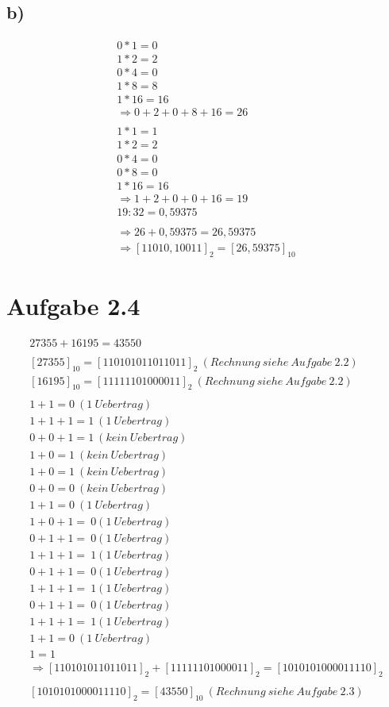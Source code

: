 \documentclass[12pt,a4paper]{article}
\begin{document}
\subsection*{b)}
\begin{align*}
0 * 1 = 0 \\
1 * 2 = 2 \\
0 * 4 = 0 \\
1 * 8 = 8 \\
1 * 16 = 16 \\
\Rightarrow 0 + 2 + 0 + 8 + 16 = 26 \\
\\
1 * 1 = 1 \\
1 * 2 = 2 \\
0 * 4 = 0 \\
0 * 8 = 0 \\
1 * 16 = 16 \\
\Rightarrow 1 + 2 + 0 + 0 + 16 = 19 \\
19 : 32 = 0,59375\\
\\
\Rightarrow 26 + 0,59375 = 26,59375 \\
\Rightarrow [11010,10011]_{2} = [26,59375]_{10}
\end{align*}

\section*{Aufgabe 2.4}
\begin{align*}
27355 + 16195 = 43550 \\
\\
[27355]_{10} = [110101011011011]_{2} ~(Rechnung ~siehe ~Aufgabe ~2.2) \\
[16195]_{10} = [11111101000011]_{2} ~(Rechnung ~siehe ~Aufgabe ~2.2) \\
\\
1 + 1 = 0 ~(1 ~Uebertrag) \\
1 + 1 + 1 = 1 ~(1 ~Uebertrag) \\
0 + 0 + 1 = 1 ~(kein ~Uebertrag) \\
1 + 0 = 1 ~(kein ~Uebertrag) \\
1 + 0 = 1 ~(kein ~Uebertrag) \\
0 + 0 = 0 ~(kein ~Uebertrag) \\
1 + 1 = 0 ~(1 ~Uebertrag) \\
1 + 0 + 1 = ~0 (1 ~Uebertrag) \\
0 + 1 + 1 = ~0 (1 ~Uebertrag) \\
1 + 1 + 1 = ~1 (1 ~Uebertrag) \\
0 + 1 + 1 = ~0 (1 ~Uebertrag) \\
1 + 1 + 1 = ~1 (1 ~Uebertrag) \\
0 + 1 + 1 = ~0 (1 ~Uebertrag) \\
1 + 1 + 1 = ~1 (1 ~Uebertrag) \\
1 + 1 = 0 ~(1 ~Uebertrag) \\
1 = 1 \\
\Rightarrow [110101011011011]_{2} + [11111101000011]_{2} = [1010101000011110]_{2} \\
\\
[1010101000011110]_{2} = [43550]_{10} ~(Rechnung ~siehe ~Aufgabe ~2.3)
\end{align*}
\end{document}
